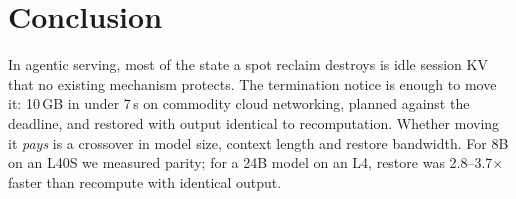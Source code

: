 \documentclass[10pt,twocolumn]{article}
\begin{document}
\section{Conclusion}
In agentic serving, most of the state a spot reclaim destroys is idle session KV that
no existing mechanism protects. The termination notice is enough to move it: 10\,GB
in under 7\,s on commodity cloud networking, planned against the deadline, and
restored with output identical to recomputation. Whether moving it \emph{pays} is a
crossover in model size, context length and restore bandwidth. For 8B on an L40S we
measured parity; for a 24B model on an L4, restore was 2.8--3.7$\times$ faster than
recompute with identical output.



\end{document}
